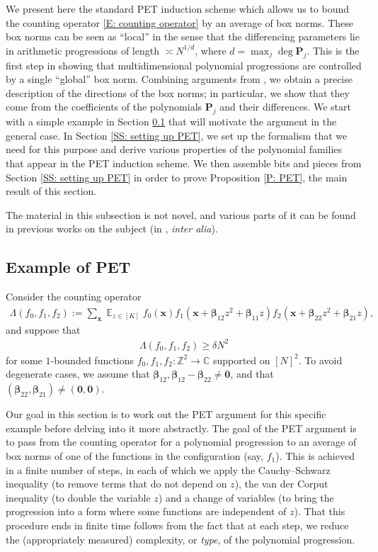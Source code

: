 \documentclass[11pt]{amsart}
\theoremstyle{definition}
\DeclareMathOperator*{\E}{\mathbb{E}}
\newcommand{\C}{{\mathbb C}}
\newcommand{\Z}{{\mathbb Z}}
\newcommand{\bp}{{\mathbf{P}}}
\newcommand{\bx}{{\mathbf{x}}}
\newcommand{\bbeta}{{\boldsymbol{\beta}}}
\begin{document}
We present here the standard PET induction scheme which allows us to bound the counting operator \eqref{E: counting operator} by an average of box norms. These box norms can be seen as ``local'' in the sense that the differencing parameters lie in arithmetic progressions of length $\asymp N^{1/d}$, where $d = \max_j \deg \bp_j$. This is the first step in showing that multidimensional polynomial progressions are controlled by a single ``global'' box norm. Combining arguments from \cite{DFKS22, Ts22}, we obtain a precise description of the directions of the box norms; in particular, we show that they come from the coefficients of the polynomials $\bp_j$ and their differences. We start with a simple example in Section \ref{SS: example of PET} that will motivate the argument in the general case. In Section \ref{SS: setting up PET}, we set up the formalism that we need for this purpose and derive various properties of the polynomial families that appear in the PET induction scheme. We then assemble bits and pieces from Section \ref{SS: setting up PET} in order to prove Proposition \ref{P: PET}, the main result of this section.

The material in this subsection is not novel, and various parts of it can be found in previous works on the subject (in \cite{DFKS22, Pel20, Pre17, Ts22}, \emph{inter alia}).


\subsection{Example of PET}\label{SS: example of PET}
Consider the counting operator
\begin{align*}
    \Lambda(f_0, f_1, f_2) := \sum_{\bx}\E_{z\in[K]}f_0(\bx)f_1(\bx + \bbeta_{12}z^2 + \bbeta_{11}z)f_2(\bx + \bbeta_{22}z^2 + \bbeta_{21}z),
\end{align*}
and suppose that 
\begin{align*}
    \Lambda(f_0, f_1, f_2)\geq \delta N^2
\end{align*}
for some $1$-bounded functions $f_0, f_1, f_2:\Z^2\to\C$ supported on $[N]^2$. To avoid degenerate cases, we assume that $\bbeta_{12}, \bbeta_{12}-\bbeta_{22}\neq \textbf{0}$, and that $(\bbeta_{22}, \bbeta_{21})\neq (\textbf{0}, \textbf{0})$.

Our goal in this section is to work out the PET argument for this specific example before delving into it more abstractly. The goal of the PET argument is to pass from the counting operator for a polynomial progression to an average of box norms of one of the functions in the configuration (say, $f_1$). This is achieved in a finite number of steps, in each of which we apply the Cauchy--Schwarz inequality (to remove terms that do not depend on $z$), the van der Corput inequality (to double the variable $z$) and a change of variables (to bring the progression into a form where some functions are independent of $z$). That this procedure ends in finite time follows from the fact that at each step, we reduce the (appropriately measured) complexity, or \textit{type}, of the polynomial progression.
\end{document}
